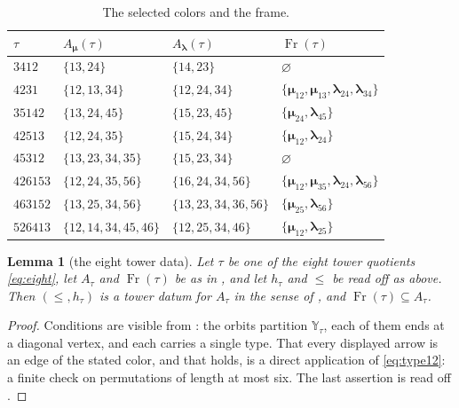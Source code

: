 \documentclass[12pt]{article}
\newtheorem{lemma}[lemma]{Lemma}
\theoremstyle{definition}
\newcommand{\pset}{A}                  %
\newcommand{\YY}{\mathbb{Y}}  %
\newcommand{\Fr}{\operatorname{Fr}}    %
\newcommand{\blam}{\boldsymbol{\lambda}}   %
\newcommand{\bmu}{\boldsymbol{\mu}}        %
\begin{document}
\begin{table}[!htbp]
\centering
\renewcommand{\arraystretch}{1.25}
\begin{tabular}{@{}l@{\qquad}l@{\qquad}l@{\qquad}l@{}}
\hline
$\tau$ & $\pset_{\bmu}(\tau)$ & $\pset_{\blam}(\tau)$ & $\Fr(\tau)$\\
\hline
$3412$   & $\{13,24\}$          & $\{14,23\}$             & $\varnothing$\\
$4231$   & $\{12,13,34\}$       & $\{12,24,34\}$          &
   $\{\bmu_{12},\bmu_{13},\blam_{24},\blam_{34}\}$\\
$35142$  & $\{13,24,45\}$       & $\{15,23,45\}$          &
   $\{\bmu_{24},\blam_{45}\}$\\
$42513$  & $\{12,24,35\}$       & $\{15,24,34\}$          &
   $\{\bmu_{12},\blam_{24}\}$\\
$45312$  & $\{13,23,34,35\}$    & $\{15,23,34\}$          & $\varnothing$\\
$426153$ & $\{12,24,35,56\}$    & $\{16,24,34,56\}$       &
   $\{\bmu_{12},\bmu_{35},\blam_{24},\blam_{56}\}$\\
$463152$ & $\{13,25,34,56\}$    & $\{13,23,34,36,56\}$    &
   $\{\bmu_{25},\blam_{56}\}$\\
$526413$ & $\{12,14,34,45,46\}$ & $\{12,25,34,46\}$       &
   $\{\bmu_{12},\blam_{25}\}$\\
\hline
\end{tabular}
\caption{The selected colors and the frame.}
\label{tab:frames}
\end{table}

\begin{lemma}[the eight tower data]\label{lem:eightdata}
Let $\tau$ be one of the eight tower quotients \eqref{eq:eight}, let
$\pset_\tau$ and $\Fr(\tau)$ be as in , and let $h_\tau$ and
$\le$ be read off  as above. Then $(\le,h_\tau)$ is a
tower datum for $\pset_\tau$ in the sense of , and
$\Fr(\tau) \subseteq \pset_\tau$.
\end{lemma}

\begin{proof}
Conditions  are visible from
: the orbits partition $\YY_\tau$, each of them ends at a
diagonal vertex, and each carries a single type. That every displayed
arrow is an edge of the stated color, and that  holds,
is a direct application of \eqref{eq:type12}: a finite check on
permutations of length at most six. The last assertion is read off
.
\end{proof}
\end{document}
